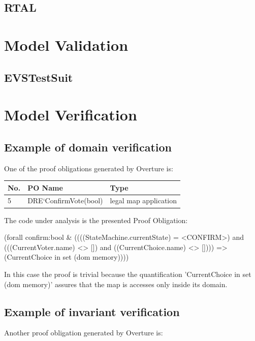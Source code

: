 \documentclass{article}
\begin{document}
\subsection{RTAL}

\section{Model Validation}
\subsection{EVSTestSuit}


\section{Model Verification}
\subsection{Example of domain verification}
One of the proof obligations generated by Overture is:

\begin{center}
    \begin{tabular}{ | l | l | p{7cm} |}
    \hline
   \textbf{No.}	& \textbf{PO Name} & \textbf{Type} \\ \hline
	5 & DRE`ConfirmVote(bool) & legal map application\\\hline
    \end{tabular}
\end{center}

The code under analysis is the presented Proof Obligation:

\begin{vdmpp}
(forall confirm:bool & ((((StateMachine.currentState) = <CONFIRM>) 
and (((CurrentVoter.name) <> []) and ((CurrentChoice.name) <> [])))
 => (CurrentChoice in set (dom memory))))
\end{vdmpp}

In this case the proof is trivial because the quantification 'CurrentChoice in set (dom memory)' assures that the map is accesses only inside its domain.

\subsection{Example of invariant verification}

Another proof obligation generated by Overture is:
\end{document}
